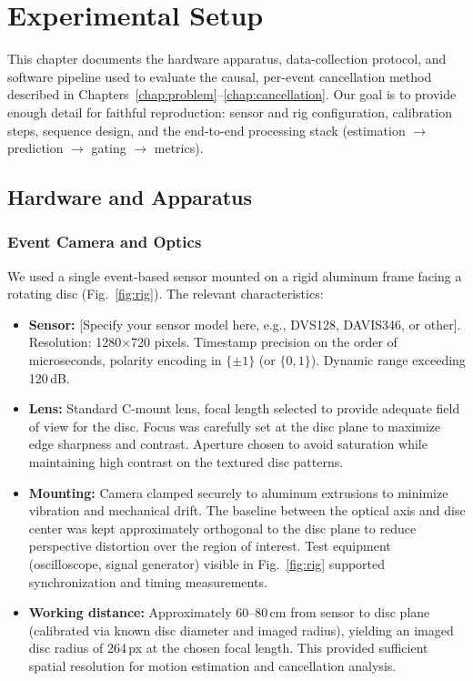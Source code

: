 \chapter{Experimental Setup}
\label{chap:setup}

This chapter documents the hardware apparatus, data-collection protocol, and software pipeline used to evaluate the causal, per-event cancellation method described in Chapters~\ref{chap:problem}--\ref{chap:cancellation}. Our goal is to provide enough detail for faithful reproduction: sensor and rig configuration, calibration steps, sequence design, and the end-to-end processing stack (estimation $\rightarrow$ prediction $\rightarrow$ gating $\rightarrow$ metrics).

\section{Hardware and Apparatus}
\label{sec:hardware}

\subsection{Event Camera and Optics}
We used a single event-based sensor mounted on a rigid aluminum frame facing a rotating disc (Fig.~\ref{fig:rig}). The relevant characteristics:

\begin{itemize}
  \item \textbf{Sensor:} [Specify your sensor model here, e.g., DVS128, DAVIS346, or other]. Resolution: 1280×720 pixels. Timestamp precision on the order of microseconds, polarity encoding in $\{\pm1\}$ (or $\{0,1\}$). Dynamic range exceeding 120\,dB.
  \item \textbf{Lens:} Standard C-mount lens, focal length selected to provide adequate field of view for the disc. Focus was carefully set at the disc plane to maximize edge sharpness and contrast. Aperture chosen to avoid saturation while maintaining high contrast on the textured disc patterns.
  \item \textbf{Mounting:} Camera clamped securely to aluminum extrusions to minimize vibration and mechanical drift. The baseline between the optical axis and disc center was kept approximately orthogonal to the disc plane to reduce perspective distortion over the region of interest. Test equipment (oscilloscope, signal generator) visible in Fig.~\ref{fig:rig} supported synchronization and timing measurements.
  \item \textbf{Working distance:} Approximately 60--80\,cm from sensor to disc plane (calibrated via known disc diameter and imaged radius), yielding an imaged disc radius of 264\,px at the chosen focal length. This provided sufficient spatial resolution for motion estimation and cancellation analysis.
\end{itemize}

